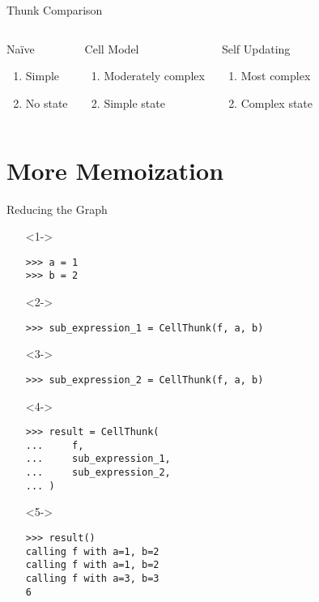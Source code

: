 \documentclass{beamer}
\begin{document}
\begin{frame}{Thunk Comparison}
  \begin{columns}[c]

    \begin{block}{Na\"ive}
      \begin{enumerate}
      \item Simple
      \item No state
      \end{enumerate}
    \end{block}

    \begin{block}{Cell Model}
      \begin{enumerate}
      \item Moderately complex
      \item Simple state
      \end{enumerate}
    \end{block}

    \begin{block}{Self Updating}
      \begin{enumerate}
      \item Most complex
      \item Complex state
      \end{enumerate}
    \end{block}
  \end{columns}
\end{frame}

\section{More Memoization}

\begin{frame}[fragile]{Reducing the Graph}
  \begin{itemize}
  \item[]<1-> \begin{verbatim}
>>> a = 1
>>> b = 2
    \end{verbatim}
  \item[]<2-> \begin{verbatim}
>>> sub_expression_1 = CellThunk(f, a, b)
    \end{verbatim}
  \item[]<3-> \begin{verbatim}
>>> sub_expression_2 = CellThunk(f, a, b)
    \end{verbatim}
  \item[]<4-> \begin{verbatim}
>>> result = CellThunk(
...     f,
...     sub_expression_1,
...     sub_expression_2,
... )
    \end{verbatim}
  \item[]<5-> \begin{verbatim}
>>> result()
calling f with a=1, b=2
calling f with a=1, b=2
calling f with a=3, b=3
6
    \end{verbatim}
  \end{itemize}
\end{frame}
\end{document}
